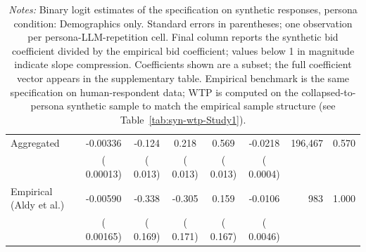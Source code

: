 \begin{table}[H]
\begin{threeparttable}
\begin{tabular}{lcccccrr}
\midrule
Aggregated &  -0.00336 &  -0.124 &   0.218 &   0.569 & -0.0218 &   196,467 &  0.570 \\
 & (  0.00013) & (  0.013) & (  0.013) & (  0.013) & ( 0.0004) & & \\
\midrule
Empirical (Aldy et al.) &  -0.00590 &  -0.338 &  -0.305 &   0.159 & -0.0106 &       983 & 1.000 \\
 & (  0.00165) & (  0.169) & (  0.171) & (  0.167) & ( 0.0046) & & \\
\bottomrule
\end{tabular}
\caption*{\footnotesize \textit{Notes:} Binary logit estimates of the \textcite{Aldy2012} specification on synthetic responses, persona condition: Demographics only. 
Standard errors in parentheses; one observation per persona-LLM-repetition cell. 
Final column reports the synthetic bid coefficient divided by the empirical bid coefficient; values below 1 in magnitude indicate slope compression. 
Coefficients shown are a subset; the full coefficient vector appears in the supplementary table. 
Empirical benchmark is the same specification on \textcite{Aldy2012} human-respondent data; WTP is computed on the collapsed-to-persona synthetic sample to match the empirical sample structure (see Table~\ref{tab:syn-wtp-Study1}).}
\end{threeparttable}
\end{table}
